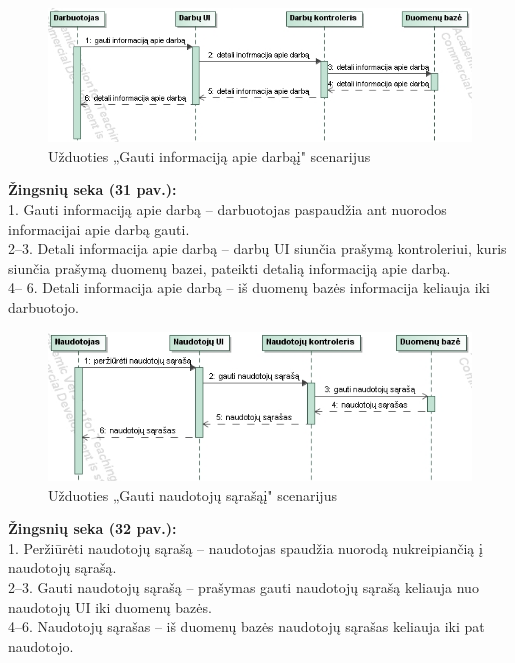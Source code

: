 \documentclass{VUMIFPSkursinis}
\begin{document}
\begin{figure}[H]
\centering
\includegraphics[width=\linewidth, frame]{img/seku(gautiinformacija).png}
\caption{Užduoties „Gauti informaciją apie darbąį" scenarijus}
\end{figure}
	\textbf{Žingsnių seka (31 pav.):}\\
	1. Gauti informaciją apie darbą – darbuotojas paspaudžia ant nuorodos informacijai apie darbą gauti.\\
	2–3. Detali informacija apie darbą – darbų UI siunčia prašymą kontroleriui, kuris siunčia prašymą duomenų bazei, pateikti detalią informaciją apie darbą.\\
	4– 6. Detali informacija apie darbą – iš duomenų bazės informacija keliauja iki darbuotojo.\\
%
\begin{figure}[H]
\centering
\includegraphics[width=\linewidth, frame]{img/seku(naudotojusarasas).png}
\caption{Užduoties „Gauti naudotojų sąrašąį" scenarijus}
\end{figure}
	\textbf{Žingsnių seka (32 pav.):}\\
	1. Peržiūrėti naudotojų sąrašą – naudotojas spaudžia nuorodą nukreipiančią į naudotojų sąrašą.\\
	2–3. Gauti naudotojų sąrašą – prašymas gauti naudotojų sąrašą keliauja nuo naudotojų UI iki duomenų bazės.\\
	4–6. Naudotojų sąrašas – iš duomenų bazės naudotojų sąrašas keliauja iki pat naudotojo.\\
%
\end{document}
